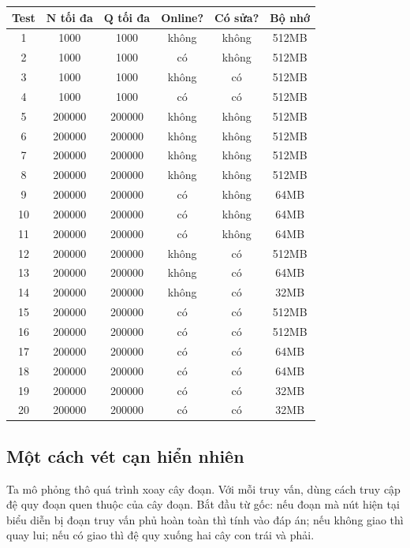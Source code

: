 \documentclass[11pt]{article}
\begin{document}
\begin{center}
\small
\begin{tabular}{c c c c c c}
\textbf{Test} & \(\boldsymbol{N}\) \textbf{tối đa} &
\(\boldsymbol{Q}\) \textbf{tối đa} & \textbf{Online?} &
\textbf{Có sửa?} & \textbf{Bộ nhớ} \\
\hline
1 & 1000 & 1000 & không & không & 512MB \\
2 & 1000 & 1000 & có & không & 512MB \\
3 & 1000 & 1000 & không & có & 512MB \\
4 & 1000 & 1000 & có & có & 512MB \\
5 & 200000 & 200000 & không & không & 512MB \\
6 & 200000 & 200000 & không & không & 512MB \\
7 & 200000 & 200000 & không & không & 512MB \\
8 & 200000 & 200000 & không & không & 512MB \\
9 & 200000 & 200000 & có & không & 64MB \\
10 & 200000 & 200000 & có & không & 64MB \\
11 & 200000 & 200000 & có & không & 64MB \\
12 & 200000 & 200000 & không & có & 512MB \\
13 & 200000 & 200000 & không & có & 64MB \\
14 & 200000 & 200000 & không & có & 32MB \\
15 & 200000 & 200000 & có & có & 512MB \\
16 & 200000 & 200000 & có & có & 512MB \\
17 & 200000 & 200000 & có & có & 64MB \\
18 & 200000 & 200000 & có & có & 64MB \\
19 & 200000 & 200000 & có & có & 32MB \\
20 & 200000 & 200000 & có & có & 32MB
\end{tabular}
\end{center}

\subsection{Một cách vét cạn hiển nhiên}

Ta mô phỏng thô quá trình xoay cây đoạn. Với mỗi truy vấn, dùng cách truy cập
đệ quy đoạn quen thuộc của cây đoạn. Bắt đầu từ gốc: nếu đoạn mà nút hiện tại
biểu diễn bị đoạn truy vấn phủ hoàn toàn thì tính vào đáp án; nếu không giao
thì quay lui; nếu có giao thì đệ quy xuống hai cây con trái và phải.
\end{document}
